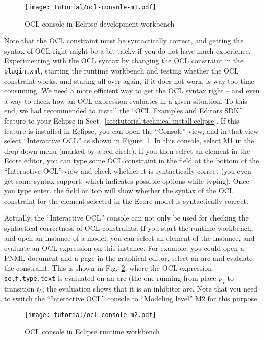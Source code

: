 \begin{figure}[p!!]
  \centerline{\texttt{[image: tutorial/ocl-console-m1.pdf]}}
  \caption{OCL console in Eclipse development workbench}
  \label{fig:tutorial:technical:constraints:ocl:m1}
\end{figure}

Note that the OCL constraint must be syntactically correct, and getting the
syntax of OCL right might be a bit tricky if you do not have much experience.
Experimenting with the OCL syntax by changing the OCL constraint in the
{\tt plugin.xml}, starting the runtime workbench and testing whether the OCL
constraint works, and staring all over again, if it does not work, is way too
time consuming. We need a more efficient way to get the OCL syntax right --
and even a way to check how an OCL expression evaluates in a given situation.
To this end, we had recommended to install the ``OCL Examples
and Editors SDK'' feature to your Eclipse in
Sect.~\ref{sec:tutorial:technical:install:eclipse}. If this feature is installed
in Eclipse, you can open the ``Console'' view, and in that view select
``Interactive OCL'' as shown in
Figure~\ref{fig:tutorial:technical:constraints:ocl:m1}. In this console, select
M1 in the drop down menu (marked by a red circle). If you then select an element
in the Ecore editor, you can type some OCL constraint in the field at the bottom of the ``Interactive
OCL'' view and check whether it is syntactically correct (you even get some
syntax support, which indicates possible options while typing).
Once you type enter, the field on top will show whether the syntax of the OCL
constraint for the element selected in the Ecore model is syntactically correct.

Actually, the ``Interactive OCL'' console can not only be used for checking the
syntactical correctness of OCL constraints. If you start the runtime workbench,
and open an instance of a model, you can select an element of the instance, and
evaluate an OCL expression on this instance. For example, you could open a
PNML document and a page in the graphical editor, select an arc and evaluate the
constraint. This is shown in
Fig.~\ref{fig:tutorial:technical:constraints:ocl:m2}, where the OCL expression
{\tt self.type.text} is evaluated on an arc (the one running from place $p_7$
to transition $t_5$; the evaluation shows that it is an inhibitor arc. Note that
you need to switch the ``Interactive OCL'' console to ``Modeling level'' M2 for
this purpose.

\begin{figure}[p!!]
  \centerline{\texttt{[image: tutorial/ocl-console-m2.pdf]}}
  \caption{OCL console in Eclipse runtime workbench}
  \label{fig:tutorial:technical:constraints:ocl:m2}
\end{figure}

